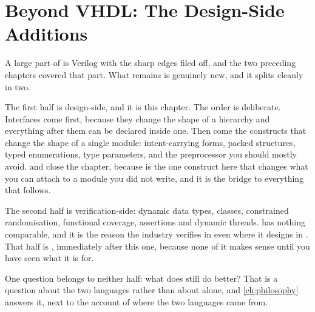 \chapter{Beyond VHDL: The Design-Side Additions}
\label{ch:beyond}


A large part of \SV{} is Verilog with the sharp edges filed off, and the two
preceding chapters covered that part. What remains is genuinely new, and it
splits cleanly in two.

The first half is design-side, and it is this chapter. The order is
deliberate. Interfaces come first, because they change the shape of a
hierarchy and everything after them can be declared inside one. Then come the
constructs that change the shape of a single module: intent-carrying
 forms, packed structures, typed enumerations, type parameters,
and the preprocessor you should mostly avoid.  and 
close the chapter, because  is the one construct here that changes
what you can attach to a module you did not write, and it is the bridge to
everything that follows.

The second half is verification-side: dynamic data types, classes,
constrained randomisation, functional coverage, assertions and dynamic
threads. \VHDL{} has nothing comparable, and it is the reason the industry
verifies in \SV{} even where it designs in \VHDL{}. That half is
, immediately after this one, because none of it makes sense
until you have seen what it is for.

One question belongs to neither half: what does \VHDL{} still do better? That
is a question about the two languages rather than about \SV{} alone, and
\cref{ch:philosophy} answers it, next to the account of where the two
languages came from.

